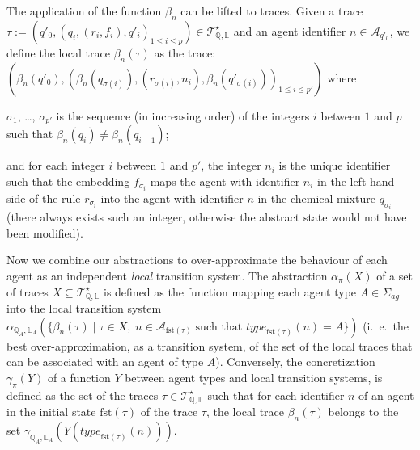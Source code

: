 \documentclass[10pt,a4paper]{llncs}
\newcommand{\bydef}{\stackrel{\scalebox{0.8}{\!\!$\scriptscriptstyle{\triangle}$}}{=}}
\renewcommand{\bydef}{:=}
\newcommand{\st}{\text{such that }}
\newcommand{\agentname}{\signaturesymb_{\textit{ag}}}
\newcommand{\signaturesymb}{\Sigma}
\newcommand{\agents}[1][]{\mathcal{A}_{#1}}
\newcommand{\type}[1][]{\textit{type}_{#1}}
\newcommand{\ie}{i.~e.~}
\newcommand{\states}{\mathbb{Q}}
\newcommand{\localstates}[1][A]{\states_{#1}}
\newcommand{\labels}{\mathbb{L}}
\newcommand{\locallabels}[1][A]{\labels_{#1}}
\newcommand{\init}[1][\tau]{\textrm{fst}(#1)}
\newcommand{\traces}[1][\states,\labels]{\mathcal{T}^{\star}_{#1}}
\newcommand{\gammatransitionsystem}[1][\states,\labels]{\gamma_{#1}}
\newcommand{\alphatransitionsystem}[1][\states,\labels]{\alpha_{#1}}
\newcommand{\alphatraceset}{\alphacomposite}%
\newcommand{\gammatraceset}{\gammacomposite}%
\newcommand{\alphacomposite}{\alpha_{\pi}}
\newcommand{\gammacomposite}{\gamma_{\pi}}
\begin{document}
The application of the function $\beta_{n}$ can be lifted to traces.  Given a trace $\tau\bydef(q'_0,(q_i,(r_i,f_i),q'_i)_{1\leq i \leq p})\in\traces$ and an agent identifier $n\in\agents[q'_0]$, we define the local trace $\beta_{n}(\tau)$ as the trace: $(\beta_n(q'_0),(\beta_n(q_{\sigma(i)}),(r_{\sigma(i)},n_i),\beta_n(q'_{\sigma(i)}{}))_{1\leq i \leq p'})$
where \begin{inparaenum}
\item $\sigma_1$, \ldots, $\sigma_{p'}$ is the sequence (in increasing order) of the integers $i$ between $1$ and $p$ such that $\beta_{n}(q_{i}) \neq \beta_{n}(q_{i+1})$;
\item and for each integer $i$ between $1$ and $p'$, the integer $n_i$ is
the unique identifier such that the embedding $f_{\sigma_i}$ maps  the agent with identifier $n_i$ in the left hand side of the rule $r_{\sigma_i}$ into the agent with identifier $n$ in the chemical mixture $q_{\sigma_i}$ (there always exists such an integer, otherwise the abstract state would not have been modified).
\end{inparaenum}

Now we  combine our abstractions to over-approximate the behaviour of each agent  as an independent \emph{local} transition system. The abstraction $\alphatraceset(X)$ of a set of traces $X\subseteq \traces$ is defined as the function mapping  each agent type $A\in\agentname$ into the local   transition system  $\alphatransitionsystem[\localstates,\locallabels](\{\beta_n(\tau) \;|\;\tau\in X,\; n\in\agents[{\init[\tau]}] \;\st \type[{\init[\tau]}](n)=A\})$ (\ie the best over-approximation, as a transition system,  of the set of the local traces that can be associated with an agent of type $A$).
Conversely, the concretization $\gammatraceset(Y)$ of a function $Y$ between agent types and local transition systems,  is defined as the set of the traces $\tau\in\traces$ such that for each identifier  $n$ of an agent in the initial state ${\init[\tau]}$ of the trace $\tau$, the local trace $\beta_n(\tau)$ belongs to the set $\gammatransitionsystem[\localstates,\locallabels](Y(\type[{\init[\tau]}](n)))$.
\end{document}
